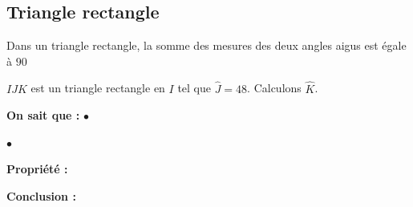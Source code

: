\documentclass[a4paper,10pt]{report}
\begin{document}
\vspace{-5mm}
\subsection{Triangle rectangle}

\begin{prop}
Dans un triangle rectangle, la somme des mesures des deux angles aigus est égale à $90$\degre
\end{prop}

\begin{ex}
$IJK$ est un triangle rectangle en $I$ tel que $\widehat{J} = 48$\degre . Calculons $\widehat{K}$.

\medskip
\noindent \begin{minipage}{12cm}

\medskip
\noindent \textbf{On sait que :} \hspace{6.7mm}$\bullet$ \dotfill \medskip \medskip%

\hspace{2.5cm}$\bullet$ \dotfill \medskip 

\medskip
\noindent \textbf{Propriété :} \dotfill \medskip \medskip%

\dotfill \medskip

\medskip
\noindent \textbf{Conclusion :}


\end{minipage}
\end{ex}
\end{document}

